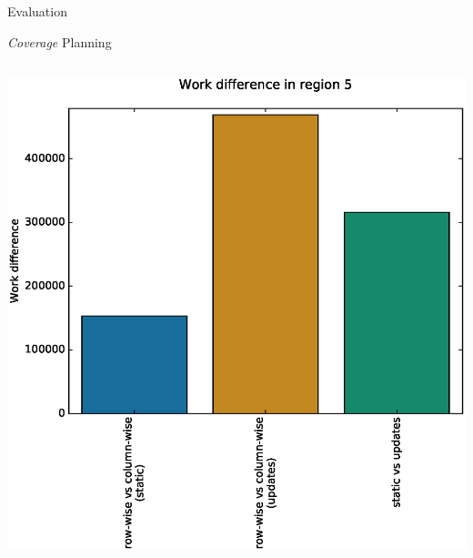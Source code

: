\documentclass[9pt]{beamer}
\begin{document}
\begin{frame}{Evaluation}
\begin{block}{\textit{Coverage} Planning}
\begin{columns}
\begin{column}{0.5\textwidth}
\begin{center}
                    \includegraphics[width=\textwidth,trim={0cm 0cm 0cm 0cm},clip]{img/diff_r5.eps}
                \end{center}
            \end{column}
        \end{columns}
    \end{block}
\end{frame}
\end{document}

